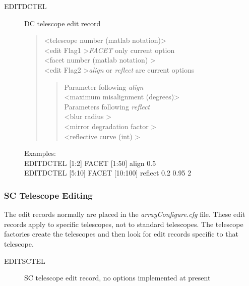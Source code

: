 \documentclass{article}
\begin{document}
\begin{description} 
\item[EDITDCTEL] DC telescope edit record
\begin{quote}
\textless telescope number (matlab notation)\textgreater \\
\textless edit Flag1 \textgreater \emph{FACET} only current option \\
\textless facet number (matlab notation) \textgreater \\
\textless edit Flag2 \textgreater \emph{align} or  \emph{reflect} 
are current options

\begin{quote}
Parameter following \emph{align} \\
\textless maximum misalignment (degrees)\textgreater \\ 

Parameters following \emph{reflect} \\
\textless blur radius \textgreater \\
\textless mirror degradation factor \textgreater \\
\textless reflective curve (int) \textgreater \\

\end{quote}
\end{quote}

Examples: \\
EDITDCTEL [1:2] FACET [1:50] align 0.5 \\
EDITDCTEL [5:10] FACET [10:100] reflect  0.2 0.95 2

\end{description}

\subsubsection{SC Telescope Editing}

The edit records normally are placed in the \emph{arrayConfigure.cfg} 
file. These edit records apply 
to specific telescopes, not to standard telescopes.
The telescope factories create the telescopes and then look for edit records
specific to that telescope. 


\begin{description} 
\item[EDITSCTEL] SC telescope edit record, no options implemented at present
\end{description}
\end{document}
